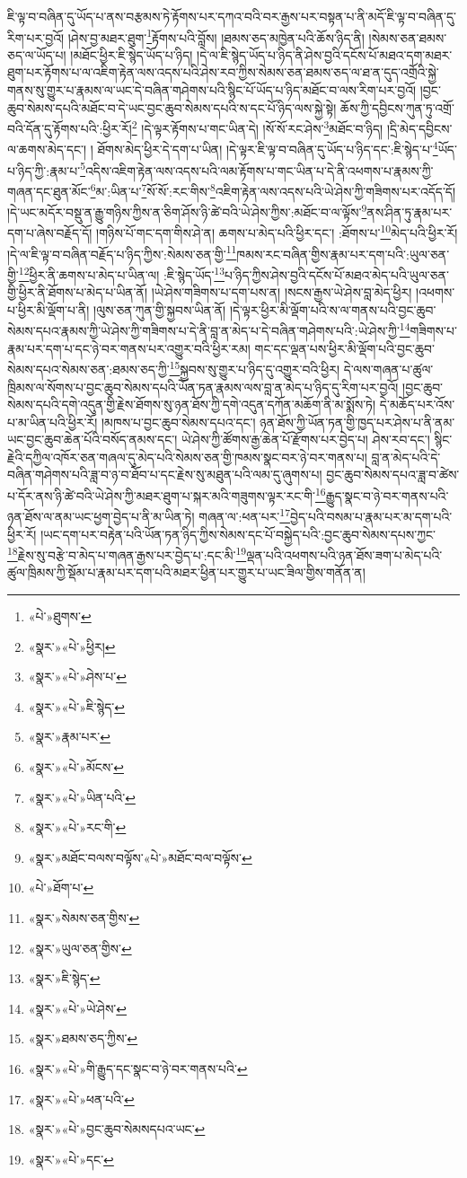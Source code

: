 ཇི་ལྟ་བ་བཞིན་དུ་ཡོད་པ་ནས་བརྩམས་ཏེ་རྟོགས་པར་དཀའ་བའི་བར་རྒྱས་པར་བསྟན་པ་ནི་མདོ་ཇི་ལྟ་བ་བཞིན་དུ་རིག་པར་བྱའོ། །ཤེས་བྱ་མཐར་ཐུག་\footnote{«པེ་»ཐུགས་}རྟོགས་པའི་བློས། །ཐམས་ཅད་མཁྱེན་པའི་ཆོས་ཉིད་ནི། །སེམས་ཅན་ཐམས་ཅད་ལ་ཡོད་པ། །མཐོང་ཕྱིར་ཇི་སྙེད་ཡོད་པ་ཉིད། །དེ་ལ་ཇི་སྙེད་ཡོད་པ་ཉིད་ནི་ཤེས་བྱའི་དངོས་པོ་མཐའ་དག་མཐར་ཐུག་པར་རྟོགས་པ་ལ་འཇིག་རྟེན་ལས་འདས་པའི་ཤེས་རབ་ཀྱིས་སེམས་ཅན་ཐམས་ཅད་ལ་ཐ་ན་དུད་འགྲོའི་སྐྱེ་གནས་སུ་གྱུར་པ་རྣམས་ལ་ཡང་དེ་བཞིན་གཤེགས་པའི་སྙིང་པོ་ཡོད་པ་ཉིད་མཐོང་བ་ལས་རིག་པར་བྱའོ། །བྱང་ཆུབ་སེམས་དཔའི་མཐོང་བ་དེ་ཡང་བྱང་ཆུབ་སེམས་དཔའི་ས་དང་པོ་ཉིད་ལས་སྐྱེ་སྟེ། ཆོས་ཀྱི་དབྱིངས་ཀུན་ཏུ་འགྲོ་བའི་དོན་དུ་རྟོགས་པའི་:ཕྱིར་རོ།\footnote{«སྣར་»«པེ་»ཕྱིར།} །དེ་ལྟར་རྟོགས་པ་གང་ཡིན་དེ། །སོ་སོ་རང་ཤེས་\footnote{«སྣར་»«པེ་»ཤེས་པ་}མཐོང་བ་ཉིད། །དྲི་མེད་དབྱིངས་ལ་ཆགས་མེད་དང་། །
ཐོགས་མེད་ཕྱིར་དེ་དག་པ་ཡིན། །དེ་ལྟར་ཇི་ལྟ་བ་བཞིན་དུ་ཡོད་པ་ཉིད་དང་:ཇི་སྙེད་པ་\footnote{«སྣར་»«པེ་»ཇི་སྙེད་}ཡོད་པ་ཉིད་ཀྱི་:རྣམ་པ་\footnote{«སྣར་»རྣམ་པར་}འདིས་འཇིག་རྟེན་ལས་འདས་པའི་ལམ་རྟོགས་པ་གང་ཡིན་པ་དེ་ནི་འཕགས་པ་རྣམས་ཀྱི་གཞན་དང་ཐུན་མོང་\footnote{«སྣར་»«པེ་»མོངས་}མ་:ཡིན་པ་\footnote{«སྣར་»«པེ་»ཡིན་པའི་}སོ་སོ་:རང་གིས་\footnote{«སྣར་»«པེ་»རང་གི་}འཇིག་རྟེན་ལས་འདས་པའི་ཡེ་ཤེས་ཀྱི་གཟིགས་པར་འདོད་དོ། །དེ་ཡང་མདོར་བསྡུ་ན་རྒྱུ་གཉིས་ཀྱིས་ན་ཅིག་ཤོས་ཉི་ཚེ་བའི་ཡེ་ཤེས་ཀྱིས་:མཐོང་བ་ལ་ལྟོས་\footnote{«སྣར་»མཐོང་བལས་བལྟོས་«པེ་»མཐོང་བལ་བལྟོས་}ནས་ཤིན་ཏུ་རྣམ་པར་དག་པ་ཞེས་བརྗོད་དོ། །གཉིས་པོ་གང་དག་གིས་ཤེ་ན། ཆགས་པ་མེད་པའི་ཕྱིར་དང་། :ཐོགས་པ་\footnote{«པེ་»ཐོག་པ་}མེད་པའི་ཕྱིར་རོ། །དེ་ལ་ཇི་ལྟ་བ་བཞིན་བརྗོད་པ་ཉིད་ཀྱིས་:སེམས་ཅན་གྱི་\footnote{«སྣར་»སེམས་ཅན་གྱིས་}ཁམས་རང་བཞིན་གྱིས་རྣམ་པར་དག་པའི་:ཡུལ་ཅན་གྱི་\footnote{«སྣར་»ཡུལ་ཅན་གྱིས་}ཕྱིར་ནི་ཆགས་པ་མེད་པ་ཡིན་ལ། :ཇི་སྙེད་ཡོད་\footnote{«སྣར་»ཇི་སྙེད་}པ་ཉིད་ཀྱིས་ཤེས་བྱའི་དངོས་པོ་མཐའ་མེད་པའི་ཡུལ་ཅན་གྱི་ཕྱིར་ནི་ཐོགས་པ་མེད་པ་ཡིན་ནོ། །ཡེ་ཤེས་གཟིགས་པ་དག་པས་ན། །སངས་རྒྱས་ཡེ་ཤེས་བླ་མེད་ཕྱིར། །འཕགས་པ་ཕྱིར་མི་ལྡོག་པ་ནི། །ལུས་ཅན་ཀུན་གྱི་སྐྱབས་ཡིན་ནོ། །དེ་ལྟར་ཕྱིར་མི་ལྡོག་པའི་ས་ལ་གནས་པའི་བྱང་ཆུབ་སེམས་དཔའ་རྣམས་ཀྱི་ཡེ་ཤེས་ཀྱི་གཟིགས་པ་དེ་ནི་བླ་ན་མེད་པ་དེ་བཞིན་གཤེགས་པའི་:ཡེ་ཤེས་ཀྱི་\footnote{«སྣར་»«པེ་»ཡེ་ཤེས་}གཟིགས་པ་རྣམ་པར་དག་པ་དང་ཉེ་བར་གནས་པར་འགྱུར་བའི་ཕྱིར་རམ། གང་དང་ལྡན་པས་ཕྱིར་མི་ལྡོག་པའི་བྱང་ཆུབ་སེམས་དཔའ་སེམས་ཅན་:ཐམས་ཅད་ཀྱི་\footnote{«སྣར་»ཐམས་ཅད་ཀྱིས་}སྐྱབས་སུ་གྱུར་པ་ཉིད་དུ་འགྱུར་བའི་ཕྱིར། དེ་ལས་གཞན་པ་ཚུལ་ཁྲིམས་ལ་སོགས་པ་བྱང་ཆུབ་སེམས་དཔའི་ཡོན་ཏན་རྣམས་ལས་བླ་ན་མེད་པ་ཉིད་དུ་རིག་པར་བྱའོ། །བྱང་ཆུབ་སེམས་དཔའི་དགེ་འདུན་གྱི་རྗེས་ཐོགས་སུ་ཉན་ཐོས་ཀྱི་དགེ་འདུན་དཀོན་མཆོག་ནི་མ་སྨོས་ཏེ། དེ་མཆོད་པར་འོས་པ་མ་ཡིན་པའི་ཕྱིར་རོ། །མཁས་པ་བྱང་ཆུབ་སེམས་དཔའ་དང་། ཉན་ཐོས་ཀྱི་ཡོན་ཏན་གྱི་ཁྱད་པར་ཤེས་པ་ནི་ནམ་ཡང་བྱང་ཆུབ་ཆེན་པོའི་བསོད་ནམས་དང་། ཡེ་ཤེས་ཀྱི་ཚོགས་རྒྱ་ཆེན་པོ་རྫོགས་པར་བྱེད་པ། ཤེས་རབ་དང་། སྙིང་རྗེའི་དཀྱིལ་འཁོར་ཅན་གཞལ་དུ་མེད་པའི་སེམས་ཅན་གྱི་ཁམས་སྣང་བར་ཉེ་བར་གནས་པ། བླ་ན་མེད་པའི་དེ་བཞིན་གཤེགས་པའི་ཟླ་བ་ཉ་བ་ཐོབ་པ་དང་རྗེས་སུ་མཐུན་པའི་ལམ་དུ་ཞུགས་པ། བྱང་ཆུབ་སེམས་དཔའ་ཟླ་བ་ཚེས་པ་དོར་ནས་ཉི་ཚེ་བའི་ཡེ་ཤེས་ཀྱི་མཐར་ཐུག་པ་སྐར་མའི་གཟུགས་ལྟར་རང་གི་\footnote{«སྣར་»«པེ་»གི་རྒྱུད་དང་སྣང་བ་ཉེ་བར་གནས་པའི་}རྒྱུད་སྣང་བ་ཉེ་བར་གནས་པའི་ཉན་ཐོས་ལ་ནམ་ཡང་ཕྱག་བྱེད་པ་ནི་མ་ཡིན་ཏེ། གཞན་ལ་:ཕན་པར་\footnote{«སྣར་»«པེ་»ཕན་པའི་}བྱེད་པའི་བསམ་པ་རྣམ་པར་མ་དག་པའི་ཕྱིར་རོ། །ཡང་དག་པར་བརྟེན་པའི་ཡོན་ཏན་ཉིད་ཀྱིས་སེམས་དང་པོ་བསྐྱེད་པའི་:བྱང་ཆུབ་སེམས་དཔས་ཀྱང་\footnote{«སྣར་»«པེ་»བྱང་ཆུབ་སེམསདཔའ་ཡང་}རྗེས་སུ་བརྩེ་བ་མེད་པ་གཞན་རྒྱས་པར་བྱེད་པ་:དང་མི་\footnote{«སྣར་»«པེ་»དང་}ལྡན་པའི་འཕགས་པའི་ཉན་ཐོས་ཟག་པ་མེད་པའི་ཚུལ་ཁྲིམས་ཀྱི་སྡོམ་པ་རྣམ་པར་དག་པའི་མཐར་ཕྱིན་པར་གྱུར་པ་ཡང་ཟིལ་གྱིས་གནོན་ན། 